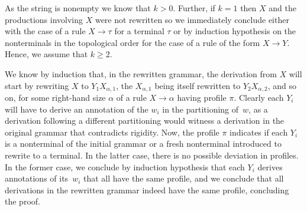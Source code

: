 As the string is nonempty we know that $k > 0$. Further, if $k = 1$ then $X$ and
the productions involving $X$ were not rewritten so we immediately conclude
either with the case of a rule $X \rightarrow \tau$ for a terminal $\tau$ or by
induction hypothesis on the nonterminals in the topological order for the case
of a rule of the form $X \rightarrow Y$. Hence, we assume that $k \geq 2$.

We know by induction that, in the rewritten grammar, the derivation from $X$
will start by rewriting $X$ to $Y_1 X_{\alpha, 1}$, the $X_{\alpha, 1}$ being
itself rewritten to $Y_2 X_{\alpha, 2}$, and so on, for some right-hand size
$\alpha$ of a rule $X \rightarrow \alpha$ having profile $\pi$. Clearly each
$Y_i$ will have to derive an annotation of the $w_i$ in the partitioning of~$w$, as
a derivation following a different partitioning would witness a derivation in
the original grammar that contradicts rigidity.
Now, the profile
$\pi$ indicates if each $Y_i$ is a nonterminal of the initial grammar or a fresh
nonterminal introduced to rewrite to a terminal. In the latter case, there is no
possible deviation in profiles. In the former case, we conclude by induction
hypothesis that each $Y_i$ derives annotations of its~$w_i$ that all have the
same profile, and we conclude that all derivations in the rewritten grammar
indeed have the same profile, concluding the proof.~\qedhere


%
%
%
%
%
%
%
%
%
%
%
%
%
%
%
%
%
%
%
%
%
%
%
%
%
%
%
%
%
%
%
%
%
%
%
%
%
%
%
%
%
%
%
%
%
%
%
%
%
%
%
%
%
%
%
%
%
%
%
%

%
%


%
%
%
%
%
%
%
%
%
%
%
%
%
%
%
%
%
%
%
%

%
%
%
%
%
%
%
%
%

%

%

